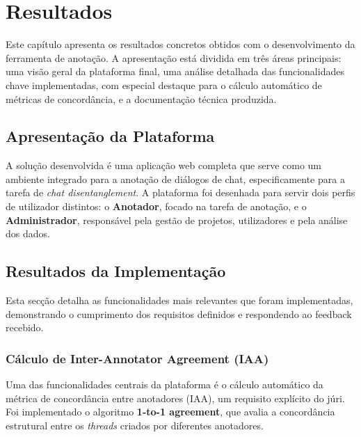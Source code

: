 \chapter{Resultados}
\label{cha:resultados}

Este capítulo apresenta os resultados concretos obtidos com o desenvolvimento da ferramenta de anotação. A apresentação está dividida em três áreas principais: uma visão geral da plataforma final, uma análise detalhada das funcionalidades chave implementadas, com especial destaque para o cálculo automático de métricas de concordância, e a documentação técnica produzida.

\section{Apresentação da Plataforma}

A solução desenvolvida é uma aplicação web completa que serve como um ambiente integrado para a anotação de diálogos de chat, especificamente para a tarefa de \textit{chat disentanglement}. A plataforma foi desenhada para servir dois perfis de utilizador distintos: o \textbf{Anotador}, focado na tarefa de anotação, e o \textbf{Administrador}, responsável pela gestão de projetos, utilizadores e pela análise dos dados.


\section{Resultados da Implementação}

Esta secção detalha as funcionalidades mais relevantes que foram implementadas, demonstrando o cumprimento dos requisitos definidos e respondendo ao feedback recebido.

\subsection{Cálculo de Inter-Annotator Agreement (IAA)}

Uma das funcionalidades centrais da plataforma é o cálculo automático da métrica de concordância entre anotadores (IAA), um requisito explícito do júri. Foi implementado o algoritmo \textbf{1-to-1 agreement}, que avalia a concordância estrutural entre os \textit{threads} criados por diferentes anotadores.

